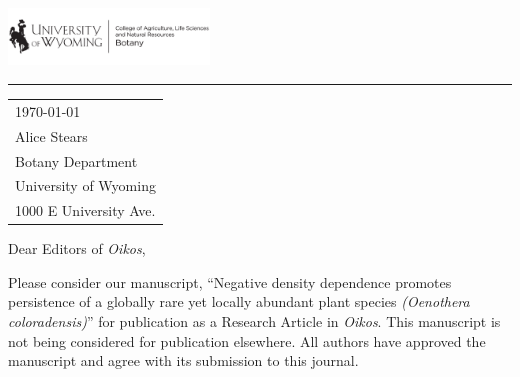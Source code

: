 \documentclass{article}
\begin{document}

\includegraphics[width=0.4\textwidth]{UWtwoline_H_Botany_black.png} %

\vspace{-1em} %

\rule{\linewidth}{1pt} %

\bigskip\bigskip %


\hfill
\begin{tabular}{l @{}}
	\today \\ %
	Alice Stears\\
        Botany Department\\
	  University of Wyoming\\ %
	1000 E University Ave. \\
\end{tabular}

\bigskip %



Dear Editors of \textit{Oikos},

\bigskip %

Please consider our manuscript, “Negative density dependence promotes persistence of a globally rare yet locally abundant plant species \textit{(Oenothera coloradensis)}” for publication as a Research Article in \textit{Oikos}. This manuscript is not being considered for publication elsewhere. All authors have approved the manuscript and agree with its submission to this journal.
\end{document}
